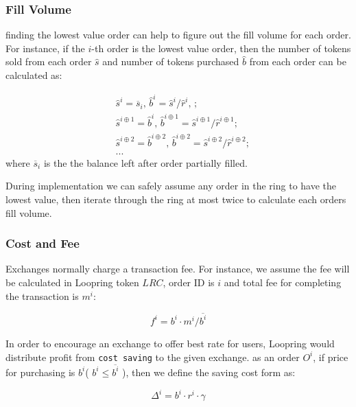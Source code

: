 \documentclass[UTF8,nofonts]{article}
\begin{document}
\subsubsection{Fill Volume\label{sec: matchquantity}}

finding the lowest value order can help to figure out the fill volume for each order. For instance, if the $i$-th order is the lowest value order, then the number of tokens sold from each order $\hat{s}$ and number of tokens purchased $\hat{b}$ from each order can be calculated as:

\[
\begin{split}
&\hat{s}^{i}=\overline{s}_i\text{, } \hat{b}^{i}=\hat{s}^{i}/ \hat{r}^i\text{, }\text{;}\\
&\hat{s}^{i\oplus 1}=\hat{b}^i\text{, } \hat{b}^{i\oplus 1}=\hat{s}^{i\oplus 1}/ \hat{r}^{i\oplus 1}\text{;}\\
&\hat{s}^{i\oplus 2}=\hat{b}^{i\oplus 2}\text{, } \hat{b}^{i\oplus 2}=\hat{s}^{i\oplus 2}/ \hat{r}^{i\oplus 2}\text{;}\\
& ...
\end{split}
\]
where $\overline{s}_i$ is the the balance left after order partially filled.

During implementation we can safely assume any order in the ring to have the lowest value, then iterate through the ring at most twice to calculate each orders fill volume. 

\subsubsection{Cost and Fee\label{sec: fee}}

Exchanges normally charge a transaction fee. For instance, we assume the fee will be calculated in Loopring token $LRC$, order ID is $i$ and total fee for completing the transaction is $m^i$: 

\begin{equation*}
f^i = b^i \cdot m^i / \overline{b^i}
\end{equation*}


In order to encourage an exchange to offer best rate for users, Loopring would distribute profit from \texttt{cost saving} to the given exchange. as an order $O^i$,  if price for purchasing is $b^i$( $b^i \le \overline{b^i}$ ),  then we define the saving cost form as: 

\begin{equation*}
\Delta^i = b^i \cdot r^i \cdot \gamma
\end{equation*}
\end{document}
